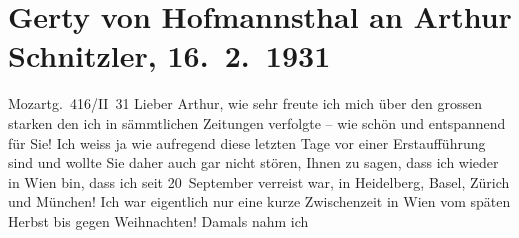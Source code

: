 

         
         \renewcommand{\erwaehntePersonen}{Personen: Erhard Buschbeck, Olga Schnitzler, Heinrich Schnitzler, Ruth Schnitzler}
         \renewcommand{\erwaehnteOrte}{Orte: Basel, Berlin, Burgtheater, Heidelberg, Mozartgasse, München, Wien, Zürich}
         \renewcommand{\erwaehnteWerke}{Werke: Der Gang zum Weiher. Dramatische Dichtung}
               \section[Gerty von Hofmannsthal an Arthur Schnitzler, 16. 2. 1931]{ Gerty von Hofmannsthal an Arthur Schnitzler, 16. 2. 1931}\nopagebreak{}\rehead{ }\begin{ledgroupsized}[t]{13cm}\normalsize\beginnumbering \toendnotes[C]{\smallbreak\pagebreak[2]} 
\toendnotes[C]{\smallbreak}\pstart
           \raggedleft{}{\pb}Mozartg. 416/II 31\pend
           \pstart
           Lieber Arthur, wie sehr freute ich mich über den grossen starken
                  \label{K_L02542-1v}\label{K_L02542-1h} den ich in sämmtlichen Zeitungen
               verfolgte – wie schön und entspannend für Sie! Ich weiss ja wie aufregend diese
               letzten Tage vor einer Erstaufführung sind und wollte Sie daher auch gar nicht
               stören, Ihnen zu sagen, dass ich wieder in Wien
               bin, dass ich seit 20 September verreist war, in Heidelberg, Basel, Zürich und München! Ich war eigentlich nur eine kurze Zwischenzeit in Wien vom späten Herbst bis gegen Weihnachten! Damals nahm ich

\end{ledgroupsized}
